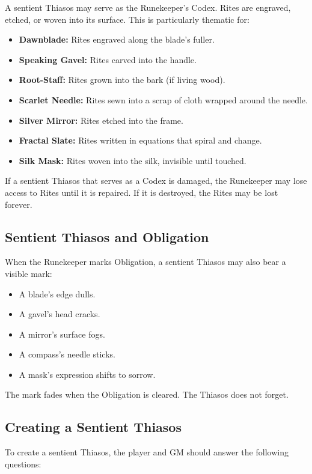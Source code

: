 A sentient Thiasos may serve as the Runekeeper's Codex. Rites are engraved, etched, or woven into its surface. This is particularly thematic for:

\begin{itemize}
\item \textbf{Dawnblade:} Rites engraved along the blade's fuller.
\item \textbf{Speaking Gavel:} Rites carved into the handle.
\item \textbf{Root-Staff:} Rites grown into the bark (if living wood).
\item \textbf{Scarlet Needle:} Rites sewn into a scrap of cloth wrapped around the needle.
\item \textbf{Silver Mirror:} Rites etched into the frame.
\item \textbf{Fractal Slate:} Rites written in equations that spiral and change.
\item \textbf{Silk Mask:} Rites woven into the silk, invisible until touched.
\end{itemize}

If a sentient Thiasos that serves as a Codex is damaged, the Runekeeper may lose access to Rites until it is repaired. If it is destroyed, the Rites may be lost forever.

\subsection{Sentient Thiasos and Obligation}

When the Runekeeper marks Obligation, a sentient Thiasos may also bear a visible mark:

\begin{itemize}
\item A blade's edge dulls.
\item A gavel's head cracks.
\item A mirror's surface fogs.
\item A compass's needle sticks.
\item A mask's expression shifts to sorrow.
\end{itemize}

The mark fades when the Obligation is cleared. The Thiasos does not forget.

\subsection{Creating a Sentient Thiasos}

To create a sentient Thiasos, the player and GM should answer the following questions:

